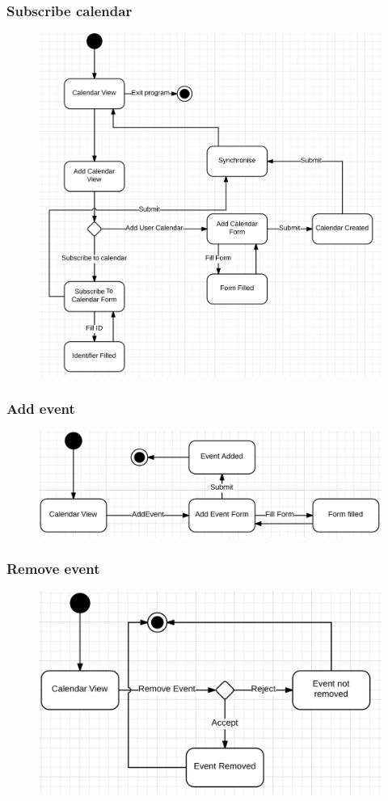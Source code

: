 \subsubsection{Subscribe calendar}
\begin{figure}[h]
\includegraphics[scale=0.70]{figures/subcalendarstate.png}
\end{figure}

\clearpage
\subsubsection{Add event}
\begin{figure}[h]
\includegraphics[scale=0.8]{figures/addeventstate.png}
\end{figure}

\clearpage
\subsubsection{Remove event}
\begin{figure}[h]
\includegraphics[scale=0.8]{figures/eventremovestate.png}
\end{figure}